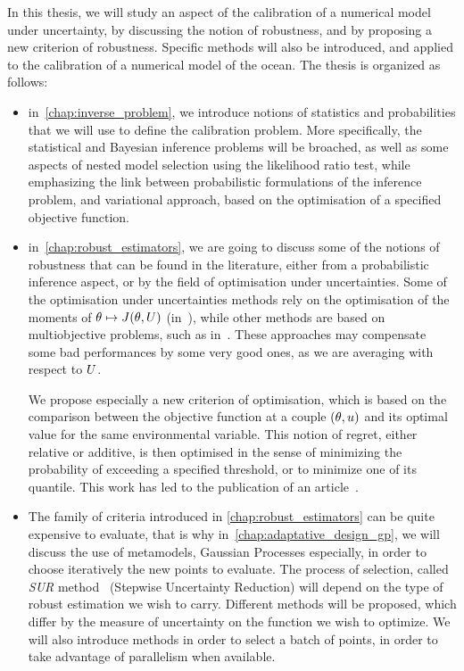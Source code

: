 \documentclass[../../Main_ManuscritThese.tex]{subfiles}
\begin{document}
In this thesis, we will study an aspect of the calibration of a
numerical model under uncertainty, by discussing the notion of
robustness, and by proposing a new criterion of robustness.  Specific
methods will also be introduced, and applied to the calibration of a
numerical model of the ocean. The thesis is organized as follows:
\begin{itemize}
\item in~\cref{chap:inverse_problem}, we introduce notions of
  statistics and probabilities that we will use to define the
  calibration problem. More specifically, the statistical and Bayesian
  inference problems will be broached, as well as some aspects of
  nested model selection using the likelihood ratio test, while
  emphasizing the link between probabilistic formulations of the
  inference problem, and variational approach, based on the
  optimisation of a specified objective function.
\item in~\cref{chap:robust_estimators}, we are going to discuss some
  of the notions of robustness that can be found in the literature,
  either from a probabilistic inference aspect, or by the field of
  optimisation under uncertainties.  Some of the optimisation under
  uncertainties methods rely on the optimisation of the moments of
  $\theta\mapsto J(\theta,U)$
  (in~\cite{lehman_designing_2004,janusevskis_simultaneous_2010}),
  while other methods are based on multiobjective problems, such as
  in~\cite{baudoui_optimisation_2012,ribaud_krigeage_2018}. These
  approaches may compensate some bad performances by some very good
  ones, as we are averaging with respect to $U$.

  We propose especially a new criterion of optimisation, which is
  based on the comparison between the objective function at a couple
  $(\theta,u)$ and its optimal value for the same environmental
  variable. This notion of regret, either relative or additive, is
  then optimised in the sense of minimizing the probability of
  exceeding a specified threshold, or to minimize one of its
  quantile. This work has led to the publication of an
  article~\cite{trappler_robust_2020}.
  
\item The family of criteria introduced in
  \cref{chap:robust_estimators} can be quite expensive to evaluate,
  that is why in~\cref{chap:adaptative_design_gp}, we will discuss the
  use of metamodels, Gaussian Processes especially, in order to choose
  iteratively the new points to evaluate. The process of selection,
  called \emph{SUR} method~\cite{bect_sequential_2012} (Stepwise
  Uncertainty Reduction) will depend on the type of robust estimation
  we wish to carry. Different methods will be proposed, which differ
  by the measure of uncertainty on the function we wish to
  optimize. We will also introduce methods in order to select a batch
  of points, in order to take advantage of parallelism when available.


\end{itemize}
\end{document}
